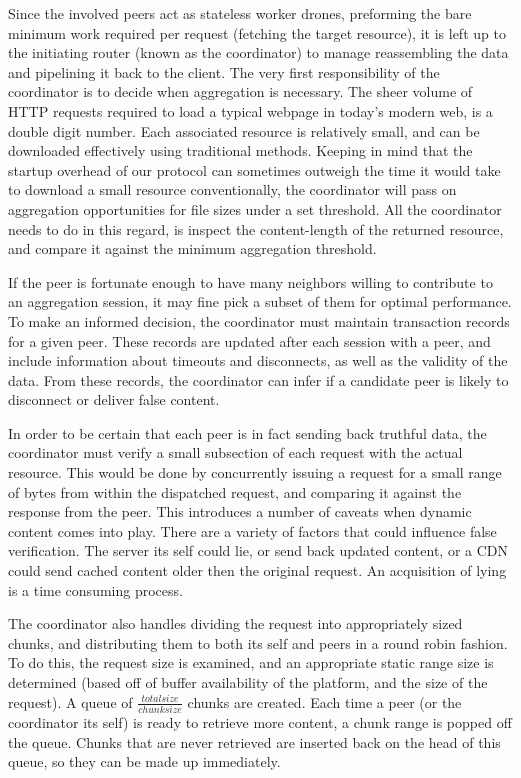 \documentclass[12pt]{article}
\begin{document}
			Since the involved peers act as stateless worker drones, preforming the bare minimum work required per request (fetching the target resource), it is left up to the initiating router (known as the coordinator) to manage reassembling the data and pipelining it back to the client. The very first responsibility of the coordinator is to decide when aggregation is necessary. The sheer volume of HTTP requests required to load a typical webpage in today's modern web, is a double digit number. Each associated resource is relatively small, and can be downloaded effectively using traditional methods. Keeping in mind that the startup overhead of our protocol can sometimes outweigh the time it would take to download a small resource conventionally, the coordinator will pass on aggregation opportunities for file sizes under a set threshold. All the coordinator needs to do in this regard, is inspect the content-length of the returned resource, and compare it against the minimum aggregation threshold.

			If the peer is fortunate enough to have many neighbors willing to contribute to an aggregation session, it may fine pick a subset of them for optimal performance. To make an informed decision, the coordinator must maintain transaction records for a given peer. These records are updated after each session with a peer, and include information about timeouts and disconnects, as well as the validity of the data. From these records, the coordinator can infer if a candidate peer is likely to disconnect or deliver false content.

			In order to be certain that each peer is in fact sending back truthful data, the coordinator must verify a small subsection of each request with the actual resource. This would be done by concurrently issuing a request for a small range of bytes from within the dispatched request, and comparing it against the response from the peer. This introduces a number of caveats when dynamic content comes into play. There are a variety of factors that could influence false verification. The server its self could lie, or send back updated content, or a CDN could send cached content older then the original request. An acquisition of lying is a time consuming process. 

			The coordinator also handles dividing the request into appropriately sized chunks, and distributing them to both its self and peers in a round robin fashion. To do this, the request size is examined, and an appropriate static range size is determined (based off of buffer availability of the platform, and the size of the request). A queue of $\frac{total size}{chunk size}$ chunks are created. Each time a peer (or the coordinator its self) is ready to retrieve more content, a chunk range is popped off the queue. Chunks that are never retrieved are inserted back on the head of this queue, so they can be made up immediately.
	
\end{document}
